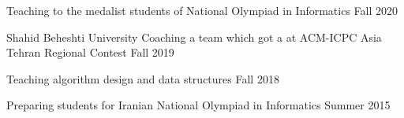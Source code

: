 \begin{cvtas}

  \cvta
    {} %
    {Teaching to the medalist students of National Olympiad in Informatics} %
    {Fall 2020} %
    {} %

  \cvta
    {Shahid Beheshti University} %
    {Coaching a team which got a  at ACM-ICPC Asia Tehran Regional Contest}
    {Fall 2019} %
    {} %

  \cvta
    {} %
    {Teaching algorithm design and data structures}
    {Fall 2018} %
    {} %





  \cvta
    {} %
    {Preparing students for Iranian National Olympiad in Informatics} %
    {Summer 2015} %
    {} %

\end{cvtas}